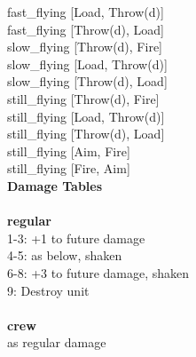 fast_flying [Load, Throw(d)] \\
fast_flying [Throw(d), Load] \\
slow_flying [Throw(d), Fire] \\
slow_flying [Load, Throw(d)] \\
slow_flying [Throw(d), Load] \\
still_flying [Throw(d), Fire] \\
still_flying [Load, Throw(d)] \\
still_flying [Throw(d), Load] \\
still_flying [Aim, Fire] \\
still_flying [Fire, Aim] \\


{\bf Damage Tables} \\
\ \\ {\bf regular } \\
1-3: +1 to future damage \\
4-5: as below, shaken \\
6-8: +3 to future damage, shaken \\
9: Destroy unit \\
\ \\ {\bf crew } \\
as regular damage \\










